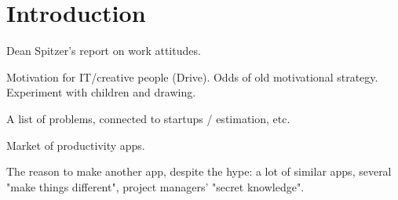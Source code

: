\chapter*{Introduction}


Dean Spitzer's report on work attitudes.

Motivation for IT/creative people (Drive). Odds of old motivational strategy. Experiment with children and drawing.

A list of problems, connected to startups / estimation, etc. 

Market of productivity apps.

The reason to make another app, despite the hype: a lot of similar apps, several "make things different", project managers' "secret knowledge".